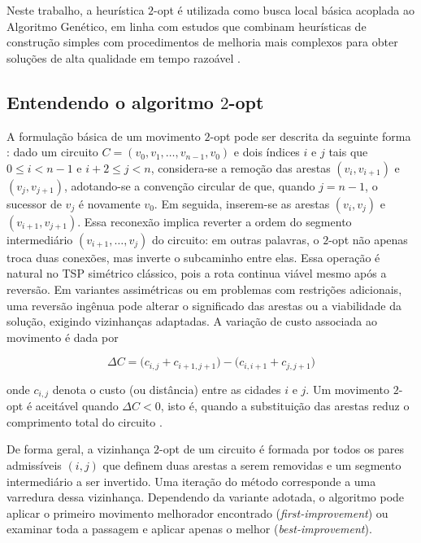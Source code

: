 Neste trabalho, a heurística \(2\)-opt é utilizada como busca local
básica acoplada ao Algoritmo Genético, em linha com estudos que combinam
heurísticas de construção simples com procedimentos de melhoria mais
complexos para obter soluções de alta qualidade em tempo razoável
\autocite{voudouris1999tsp,larranaga1999genetic,fujimoto2011highly}.

\subsection{Entendendo o algoritmo \(2\)-opt}\label{sec-221-2opt}

A formulação básica de um movimento \(2\)-opt pode ser descrita da
seguinte forma \autocite{croes1958method}: dado um circuito
\(C = (v_0, v_1, \dots, v_{n-1}, v_0)\) e dois índices \(i\) e \(j\)
tais que \(0 \leq i < n-1\) e \(i+2 \leq j < n\), considera-se a remoção
das arestas \((v_i, v_{i+1})\) e \((v_j, v_{j+1})\), adotando-se a
convenção circular de que, quando \(j = n-1\), o sucessor de \(v_j\) é
novamente \(v_0\). Em seguida, inserem-se as arestas \((v_i, v_j)\) e
\((v_{i+1}, v_{j+1})\). Essa reconexão implica reverter a ordem do
segmento intermediário \((v_{i+1}, \dots, v_j)\) do circuito: em outras
palavras, o \(2\)-opt não apenas troca duas conexões, mas inverte o
subcaminho entre elas. Essa operação é natural no TSP simétrico
clássico, pois a rota continua viável mesmo após a reversão. Em
variantes assimétricas ou em problemas com restrições adicionais, uma
reversão ingênua pode alterar o significado das arestas ou a viabilidade
da solução, exigindo vizinhanças adaptadas. A variação de custo
associada ao movimento é dada por

\[
  \Delta C = \bigl(c_{i,j} + c_{i+1,j+1}\bigr)
  - \bigl(c_{i,i+1} + c_{j,j+1}\bigr)
\]

onde \(c_{i,j}\) denota o custo (ou distância) entre as cidades \(i\) e
\(j\). Um movimento \(2\)-opt é aceitável quando \(\Delta C < 0\), isto
é, quando a substituição das arestas reduz o comprimento total do
circuito \autocite{croes1958method}.

De forma geral, a vizinhança \(2\)-opt de um circuito é formada por
todos os pares admissíveis \((i,j)\) que definem duas arestas a serem
removidas e um segmento intermediário a ser invertido. Uma iteração do
método corresponde a uma varredura dessa vizinhança. Dependendo da
variante adotada, o algoritmo pode aplicar o primeiro movimento
melhorador encontrado (\emph{first-improvement}) ou examinar toda a
passagem e aplicar apenas o melhor (\emph{best-improvement}).

